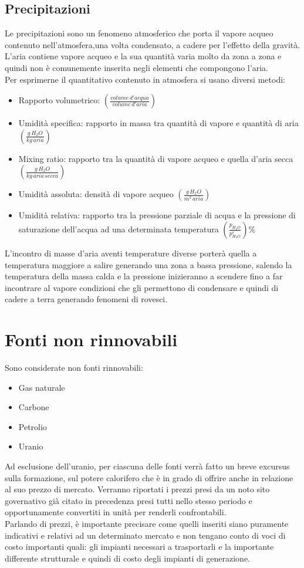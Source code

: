 \subsection{Precipitazioni}
Le precipitazioni sono un fenomeno atmosferico che porta il vapore acqueo contenuto nell'atmosfera,una volta condensato, a cadere per l'effetto della gravità.\\
L'aria contiene vapore acqueo e la sua quantità varia molto da zona a zona e quindi non è comunemente inserita negli elementi che compongono l'aria.\\
Per esprimerne il quantitativo contenuto in atmosfera si usano diversi metodi:
\begin{itemize}
    \item Rapporto volumetrico: $(\frac{volume\,  d'acqua}{volume\,  d'aria})$
    \item Umidità specifica: rapporto in massa tra quantità di vapore e quantità di aria  $(\frac{g\, H_2O}{kg\, aria})$
    \item Mixing ratio: rapporto tra la quantità di vapore acqueo e quella d'aria secca $(\frac{g\, H_2O}{kg\, aria\, secca})$
    \item Umidità assoluta: densità di vapore acqueo $(\frac{g\, H_2O}{m^3\, aria})$
    \item Umidità relativa: rapporto tra la pressione parziale di acqua e la pressione di saturazione dell'acqua ad una determinata temperatura $(\frac{p_{H_2O} }{p_{H_2O}^s})\%$
\end{itemize}
L'incontro di masse d'aria aventi temperature diverse porterà quella a temperatura maggiore a salire generando una zona a bassa pressione, salendo la temperatura della massa calda e la pressione inizieranno a scendere fino a far incontrare al vapore condizioni che gli permettono di condensare e quindi di cadere a terra generando fenomeni di rovesci.\\
\newpage
\section{Fonti non rinnovabili}
Sono considerate non fonti rinnovabili:
\begin{itemize}
    \item Gas naturale
    \item Carbone
    \item Petrolio
    \item Uranio
\end{itemize}
Ad esclusione dell'uranio, per ciascuna delle fonti verrà fatto un breve excursus sulla formazione, sul potere calorifero che è in grado di offrire anche in relazione al suo prezzo di mercato. Verranno riportati i prezzi presi da un noto sito governativo già citato in precedenza presi tutti nello stesso periodo e opportunamente convertiti in unità per renderli confrontabili.\\
Parlando di prezzi, è importante precisare come quelli inseriti siano puramente indicativi e relativi ad un determinato mercato e non tengano conto di voci di costo importanti quali: gli impianti necessari a trasportarli e la importante differente strutturale e quindi di costo degli impianti di generazione.\\
